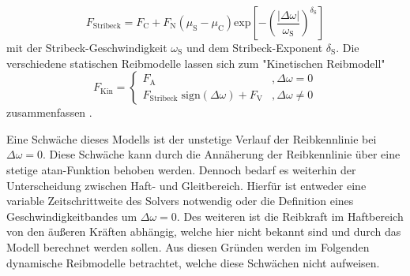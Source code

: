 \begin{equation}
F_\mathrm{Stribeck} = F_\mathrm{C} + F_\mathrm{N}(\mu_\mathrm{S}-\mu_\mathrm{C})\mathrm{exp}\left[-\left(\frac{\vert\Delta \omega \vert}{\omega_\mathrm{S}}\right)^{\delta_\mathrm{S}}\right]
\end{equation} 
mit der Stribeck-Geschwindigkeit $\omega_\mathrm{S}$ und dem Stribeck-Exponent $\delta_\mathrm{S}$. Die verschiedene statischen Reibmodelle lassen sich zum "Kinetischen Reibmodell" 
\begin{equation}
F_\mathrm{Kin} = \begin{cases}F_\mathrm{A} &,\Delta \omega=0 \\
 F_\mathrm{Stribeck}\; \mathrm{sign}(\Delta \omega)+F_\mathrm{V} &, \Delta \omega \neq 0\end{cases}
\end{equation}
zusammenfassen \cite{Altpeter.1999}.

Eine Schwäche dieses Modells ist der unstetige Verlauf der Reibkennlinie bei $\Delta \omega=0$. Diese Schwäche kann durch die Annäherung der Reibkennlinie über eine stetige atan-Funktion behoben werden. Dennoch bedarf es weiterhin der Unterscheidung zwischen Haft- und Gleitbereich. Hierfür ist entweder eine variable Zeitschrittweite des Solvers notwendig oder die Definition eines Geschwindigkeitbandes um $\Delta\omega=0$. Des weiteren ist die Reibkraft im Haftbereich von den äußeren Kräften abhängig, welche hier nicht bekannt sind und durch das Modell berechnet werden sollen. Aus diesen Gründen werden im Folgenden dynamische Reibmodelle betrachtet, welche diese Schwächen nicht aufweisen. 

